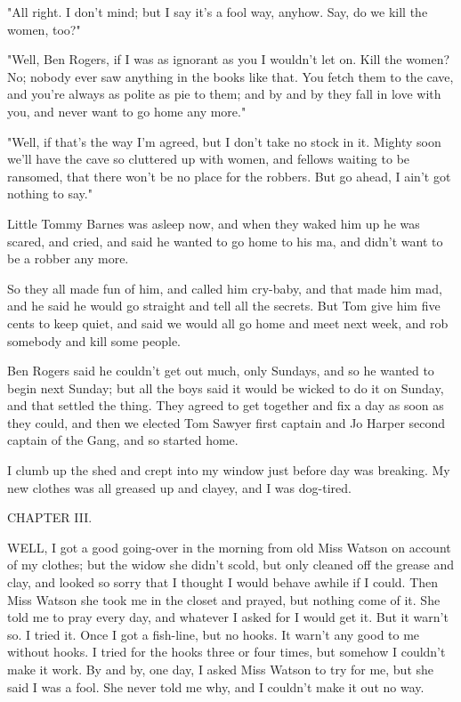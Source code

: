 "All right.  I don't mind; but I say it's a fool way, anyhow.  Say, do we
kill the women, too?"

"Well, Ben Rogers, if I was as ignorant as you I wouldn't let on.  Kill
the women?  No; nobody ever saw anything in the books like that.  You
fetch them to the cave, and you're always as polite as pie to them; and
by and by they fall in love with you, and never want to go home any
more."

"Well, if that's the way I'm agreed, but I don't take no stock in it.
Mighty soon we'll have the cave so cluttered up with women, and fellows
waiting to be ransomed, that there won't be no place for the robbers.
But go ahead, I ain't got nothing to say."

Little Tommy Barnes was asleep now, and when they waked him up he was
scared, and cried, and said he wanted to go home to his ma, and didn't
want to be a robber any more.

So they all made fun of him, and called him cry-baby, and that made him
mad, and he said he would go straight and tell all the secrets.  But Tom
give him five cents to keep quiet, and said we would all go home and meet
next week, and rob somebody and kill some people.

Ben Rogers said he couldn't get out much, only Sundays, and so he wanted
to begin next Sunday; but all the boys said it would be wicked to do it
on Sunday, and that settled the thing.  They agreed to get together and
fix a day as soon as they could, and then we elected Tom Sawyer first
captain and Jo Harper second captain of the Gang, and so started home.

I clumb up the shed and crept into my window just before day was
breaking. My new clothes was all greased up and clayey, and I was
dog-tired.




CHAPTER III.

WELL, I got a good going-over in the morning from old Miss Watson on
account of my clothes; but the widow she didn't scold, but only cleaned
off the grease and clay, and looked so sorry that I thought I would
behave awhile if I could.  Then Miss Watson she took me in the closet and
prayed, but nothing come of it.  She told me to pray every day, and
whatever I asked for I would get it.  But it warn't so.  I tried it.
Once I got a fish-line, but no hooks.  It warn't any good to me without
hooks.  I tried for the hooks three or four times, but somehow I couldn't
make it work.  By and by, one day, I asked Miss Watson to try for me, but
she said I was a fool.  She never told me why, and I couldn't make it out
no way.


